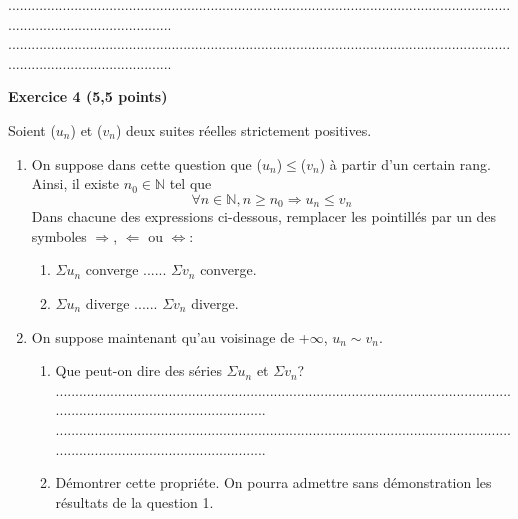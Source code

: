\documentclass{article}
\begin{document}
\begin{footnotesize}
\begin{enumerate}
\begin{enumerate}
        ...........................................................................................................................................................................\newline
        ...........................................................................................................................................................................
    \end{enumerate}
\end{enumerate}
\end{footnotesize}
\newpage
\noindent\textbf{Exercice 4 (5,5 points)}\newline
\begin{footnotesize}
Soient ($u_{n}$) et ($v_{n}$) deux suites réelles strictement positives.
\begin{enumerate}
    \item On suppose dans cette question que ($u_{n}$)$\leqslant$($v_{n}$) à partir d'un certain rang. Ainsi, il existe $n_{0} \in \mathbb{N}$ tel que
    \[ \forall n\in \mathbb{N}, n\geqslant n_{0} \Longrightarrow u_{n}\leqslant v_{n}\]
    Dans chacune des expressions ci-dessous, remplacer les pointillés par un des symboles $\Longrightarrow$, $\Longleftarrow$ ou $\Longleftrightarrow$:
    \begin{enumerate}
        \item $\Sigma u_{n}$ converge ...... $\Sigma v_{n}$ converge.
        \item $\Sigma u_{n}$ diverge ...... $\Sigma v_{n}$ diverge.
    \end{enumerate}
    \item On suppose maintenant qu'au voisinage de +$\infty$, $u_{n}\sim v_{n}$.
    \begin{enumerate}
        \item Que peut-on dire des séries $\Sigma u_{n}$ et $\Sigma v_{n}$?\newline\newline
        ...........................................................................................................................................................................\newline
        ...........................................................................................................................................................................\newline\newline
        \item Démontrer cette propriéte. On pourra admettre sans démonstration les résultats de la question 1.\newline\newline

\end{enumerate}
\end{enumerate}
\end{footnotesize}
\end{document}
